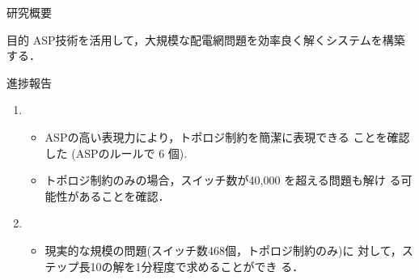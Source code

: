 \documentclass[dvipdfmx,11pt]{beamer}
\begin{document}
\begin{frame}{研究概要}
 \begin{alertblock}{目的}\centering
  ASP技術を活用して，大規模な配電網問題を効率良く解くシステムを構築
  する．
 \end{alertblock}
 \vfill
  \begin{block}{進捗報告}
    \begin{enumerate}
    \item {}
      \begin{itemize}
      \item ASPの高い表現力により，トポロジ制約を簡潔に表現できる
			ことを確認した (ASPのルールで 6 個).
      \item トポロジ制約のみの場合，スイッチ数が40,000 を超える問題も解け
        る可能性があることを確認．
      \end{itemize}
    \item {}
      \begin{itemize}
      \item 現実的な規模の問題(スイッチ数468個，トポロジ制約のみ)に
        対して，ステップ長10の解を1分程度で求めることができ
        る．
      \end{itemize}
    \end{enumerate}
  \end{block}
\end{frame} 
\end{document}

